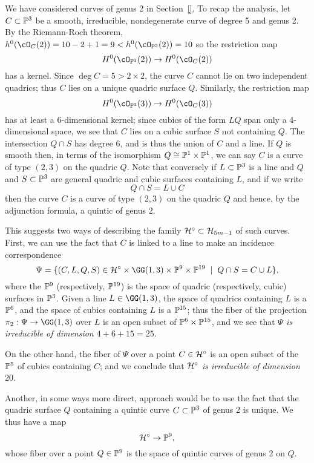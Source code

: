 We have considered curves of genus 2 in Section~\ref{}.  To recap the analysis, let $C \subset \PP^3$ be a smooth, irreducible, nondegenerate curve of degree 5 and genus 2. By the Riemann-Roch theorem,  $h^0(\cO_C(2)) = 10-2+1 = 9<h^0(\cO_{\PP^3}(2)) = 10$  so the restriction map
$$
H^0(\cO_{\PP^3}(2)) \to H^0(\cO_C(2))
$$
has a kernel. Since $\deg C = 5 > 2\times 2$, the curve $C$ cannot lie on two independent quadrics; thus $C$ lies on a unique quadric surface $Q$. Similarly, the restriction map
$$
H^0(\cO_{\PP^3}(3)) \to H^0(\cO_C(3))
$$
has at least a 6-dimensional kernel; since cubics of the form $LQ$ span only a 4-dimensional space, we see that $C$ lies on a cubic surface $S$ not containing $Q$. The intersection $Q\cap S$
has degree 6, and is thus the union of $C$ and a line. If $Q$ is smooth then, in terms of the isomorphism $Q \cong \PP^1 \times \PP^1$, we can say $C$ is a curve of type $(2,3)$ on the quadric $Q$. Note that conversely if $L \subset \PP^3$ is a line and $Q$ and $S \subset \PP^3$ are general quadric and cubic surfaces containing $L$, and if we write
$$
Q \cap S = L \cup C
$$ 
then the curve $C$ is a curve of type $(2,3)$ on the quadric $Q$ and hence, by the adjunction formula,
 a quintic of genus 2.

This suggests two ways of describing the family $\cH^\circ \subset \cH_{5m-1}$ of such curves. First, we can use the fact that $C$ is linked to a line to make an incidence correspondence
$$
\Psi = \{ (C, L, Q, S) \in \cH^\circ \times \GG(1,3) \times \PP^9 \times \PP^{19} \; \mid \; Q \cap S = C \cup L \},
$$
where the $\PP^9$ (respectively, $\PP^{19}$) is the space of quadric (respectively, cubic) surfaces in $\PP^3$. Given a line $L \in \GG(1,3)$, the space of quadrics containing $L$ is a $\PP^6$, and the space of cubics containing $L$ is a $\PP^{15}$; thus the fiber of the projection $\pi_2 : \Psi \to \GG(1,3)$ over $L$ is an open subset of $\PP^6 \times \PP^{15}$, and we see that \emph{$\Psi$ is irreducible of dimension $4 + 6 + 15 = 25$}.

On the other hand, the fiber of $\Psi$ over a point $C \in \cH^\circ$ is an open subset of the $\PP^5$ of cubics containing $C$; and we conclude that \emph{$\cH^\circ$ is irreducible of dimension $20$}.

Another, in some ways more direct, approach would be to use the fact that the quadric surface $Q$ containing a quintic curve $C \subset \PP^3$ of genus 2 is unique. We thus have a map
$$
\cH^\circ \to \PP^9,
$$
whose fiber over a point $Q \in \PP^9$ is the space of quintic curves of genus 2 on $Q$. 

